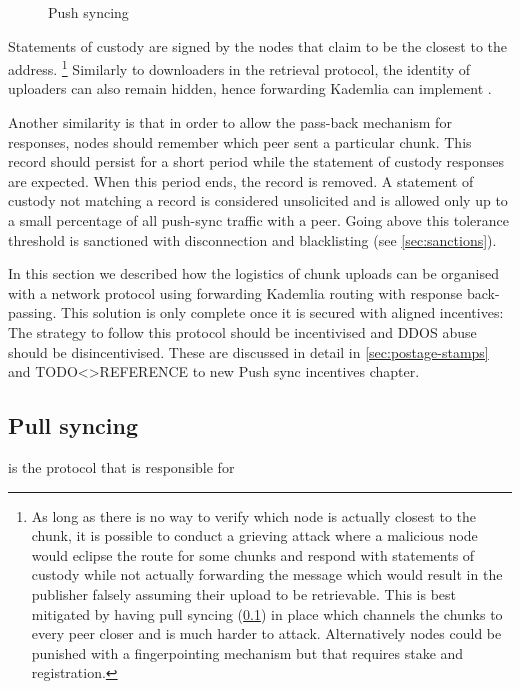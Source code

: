 \begin{figure}[htbp]
   \centering
   \caption[Push syncing]{Push syncing}
   \label{fig:push-syncing}
\end{figure}

Statements of custody are signed by the nodes that claim to be the closest to the address.%
%
\footnote{As long as there is no way to verify  which node is actually closest to the chunk, it is possible to conduct a grieving attack where a malicious node would eclipse the route for some chunks and respond with statements of custody while not actually forwarding the message which would result in the publisher falsely assuming their upload to be retrievable. This is best mitigated by having pull syncing (\ref{sec:pull-syncing}) in place which channels the chunks to every peer closer and is much harder to attack. Alternatively nodes could be punished with a fingerpointing mechanism but that requires stake and registration.}
%
Similarly to downloaders in the retrieval protocol, the identity of uploaders can also remain hidden, hence forwarding Kademlia can implement .

Another similarity is that in order to allow the pass-back mechanism for responses, nodes should remember which peer sent a particular chunk. This record should persist for a short period while the statement of custody responses are expected. When this period ends, the record is removed. A statement of custody not matching a record is considered unsolicited and is allowed only up to a small percentage of all push-sync traffic with a peer. Going above this tolerance threshold is sanctioned with disconnection and blacklisting (see \ref{sec:sanctions}).

In this section we described how the logistics of chunk uploads can be organised with a network protocol using forwarding Kademlia routing with response back-passing. This solution is only complete once it is secured with aligned incentives: The strategy to follow this protocol should be incentivised and DDOS abuse should be disincentivised. These are discussed in detail in \ref{sec:postage-stamps} and TODO<>REFERENCE to new Push sync incentives chapter.

\subsection{Pull syncing}\label{sec:pull-syncing}

 is the protocol that is responsible for 

